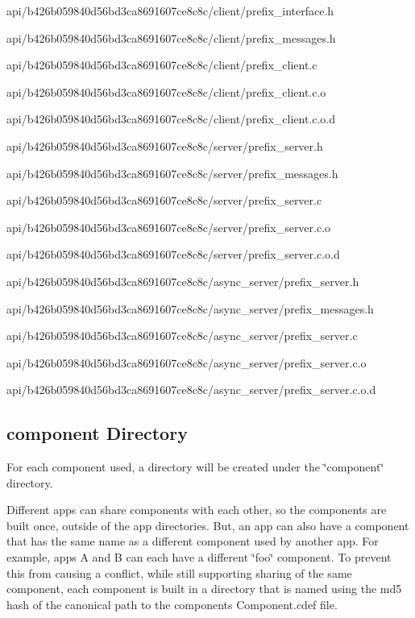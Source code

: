 \begin{DoxyItemize}
\item api/b426b059840d56bd3ca8691607ce8c8c/client/prefix\+\_\+interface.\+h
\item api/b426b059840d56bd3ca8691607ce8c8c/client/prefix\+\_\+messages.\+h
\item api/b426b059840d56bd3ca8691607ce8c8c/client/prefix\+\_\+client.\+c
\item api/b426b059840d56bd3ca8691607ce8c8c/client/prefix\+\_\+client.\+c.\+o
\item api/b426b059840d56bd3ca8691607ce8c8c/client/prefix\+\_\+client.\+c.\+o.\+d
\item api/b426b059840d56bd3ca8691607ce8c8c/server/prefix\+\_\+server.\+h
\item api/b426b059840d56bd3ca8691607ce8c8c/server/prefix\+\_\+messages.\+h
\item api/b426b059840d56bd3ca8691607ce8c8c/server/prefix\+\_\+server.\+c
\item api/b426b059840d56bd3ca8691607ce8c8c/server/prefix\+\_\+server.\+c.\+o
\item api/b426b059840d56bd3ca8691607ce8c8c/server/prefix\+\_\+server.\+c.\+o.\+d
\item api/b426b059840d56bd3ca8691607ce8c8c/async\+\_\+server/prefix\+\_\+server.\+h
\item api/b426b059840d56bd3ca8691607ce8c8c/async\+\_\+server/prefix\+\_\+messages.\+h
\item api/b426b059840d56bd3ca8691607ce8c8c/async\+\_\+server/prefix\+\_\+server.\+c
\item api/b426b059840d56bd3ca8691607ce8c8c/async\+\_\+server/prefix\+\_\+server.\+c.\+o
\item api/b426b059840d56bd3ca8691607ce8c8c/async\+\_\+server/prefix\+\_\+server.\+c.\+o.\+d
\end{DoxyItemize}\hypertarget{mkToolsDesign_mkToolsDesign_workingDirs_component}{}\subsection{component Directory}\label{mkToolsDesign_mkToolsDesign_workingDirs_component}
For each component used, a directory will be created under the \char`\"{}component\char`\"{} directory.

Different apps can share components with each other, so the components are built once, outside of the app directories. But, an app can also have a component that has the same name as a different component used by another app. For example, apps A and B can each have a different \char`\"{}foo\char`\"{} component. To prevent this from causing a conflict, while still supporting sharing of the same component, each component is built in a directory that is named using the md5 hash of the canonical path to the component\textquotesingle{}s Component.\+cdef file.



